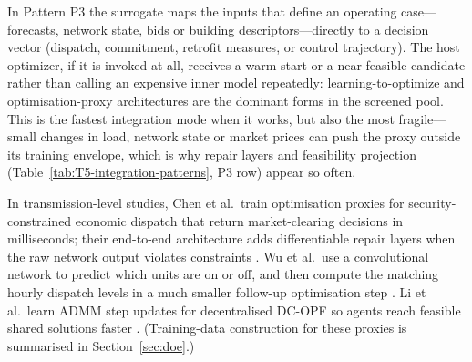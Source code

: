 In Pattern P3 the surrogate maps the inputs that define an operating
case---forecasts, network state, bids or building descriptors---directly
to a decision vector (dispatch, commitment, retrofit measures, or control
trajectory).
The host optimizer, if it is invoked at all, receives a warm start or a
near-feasible candidate rather than calling an expensive inner model
repeatedly: learning-to-optimize and optimisation-proxy architectures
are the dominant forms in the screened pool.
This is the fastest integration mode when it works, but also the most
fragile---small changes in load, network state or market prices can push
the proxy outside its training envelope, which is why repair layers and
feasibility projection (Table~\ref{tab:T5-integration-patterns}, P3 row)
appear so often.

In transmission-level studies, Chen et al.\ train optimisation proxies
for security-constrained economic dispatch that return market-clearing
decisions in milliseconds; their end-to-end architecture adds
differentiable repair layers when the raw network output violates
constraints \cite{Chen2022,Chen20244723}. Wu et al.\ use a convolutional
network to predict which units are on or off, and then compute the
matching hourly dispatch levels in a much smaller follow-up
optimisation step \cite{Wu2022231}. Li et al.\ learn ADMM step updates for
decentralised DC-OPF so agents reach feasible shared solutions faster
\cite{Li2023__2}. (Training-data construction for these proxies is
summarised in Section~\ref{sec:doe}.)

